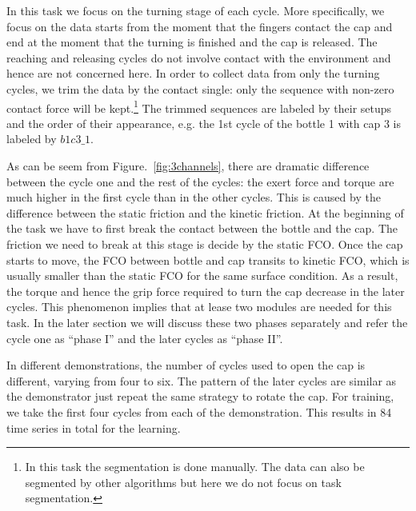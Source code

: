 In this task we focus on the turning stage of each cycle. More specifically, we focus on the data starts from the moment that the fingers contact the cap and end at the moment that the turning is finished and the cap is released. The reaching and releasing cycles do not involve contact with the environment and hence are not concerned here.
In order to collect data from only the turning cycles, we trim the data by the contact single: only the sequence with non-zero contact force will be kept.\footnote{In this task the segmentation is done manually. The data can also be segmented by other algorithms but here we do not focus on task segmentation.} The trimmed sequences are labeled by their setups and the order of their appearance, e.g. the 1st cycle of the bottle 1 with cap 3 is labeled by $b1c3\_1$.

As can be seem from Figure.~\ref{fig:3channels}, there are dramatic difference between the cycle one and the rest of the cycles: the exert force and torque are much higher in the first cycle than in the other cycles. This is caused by the difference between the static friction and the kinetic friction. At the beginning of the task we have to first break the contact between the bottle and the cap. The friction we need to break at this stage is decide by the static FCO. Once the cap starts to move, the FCO between bottle and cap transits to kinetic FCO, which is usually smaller than the static FCO for the same surface condition. As a result, the torque and hence the grip force required to turn the cap decrease in the later cycles. This phenomenon implies that at lease two modules are needed for this task. In the later section we will discuss these two phases separately and refer the cycle one as ``phase I'' and the later cycles as ``phase II''.

In different demonstrations, the number of cycles used to open the cap is different, varying from four to six. The pattern of the later cycles  are similar as the demonstrator just repeat the same strategy to rotate the cap. For training, we take the first four cycles from each of the demonstration. This results in 84 time series in total for the learning.

